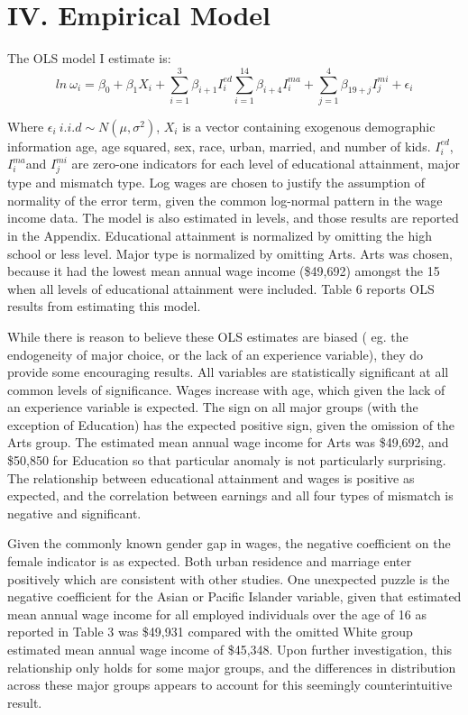 \documentclass[11pt]{article}
\theoremstyle{definition}
\begin{document}
 
\section*{ IV. Empirical Model}
\normalsize
\indent
\par
The OLS model I estimate is:
\begin{equation*}
ln \ \omega_{i}=\beta_{0}+\beta_{1}X_{i}+ \sum_{i=1}^{3} \beta_{i+1}I_{i}^{ed} \sum_{i=1}^{14} \beta_{i+4}I_{i}^{ma} + \sum_{j=1}^{4}\beta_{19+j}I_{j}^{mi}+\epsilon_{i}
\end{equation*}


Where $\epsilon_{i} \ i.i.d \sim N(\mu,\sigma^{2})$, $X_{i}$ is a vector containing exogenous demographic information age, age squared, sex, race, urban, married, and number of kids.  $I_{i}^{ed}$, $I_{i}^{ma}$and $I_{j}^{mi}$ are zero-one indicators for each level of educational attainment, major type and mismatch type.  Log wages are chosen to justify the assumption of normality of the error term, given the common log-normal pattern in the wage income data.  The model is also estimated in levels, and those results are reported in the Appendix.  Educational attainment is normalized by omitting the high school or less level.  Major type is normalized by omitting Arts.  Arts was chosen, because it had the lowest mean annual wage income (\$49,692) amongst the 15 when all levels of educational attainment were included.    Table 6 reports OLS results from estimating this model.

\vspace{2mm}
\normalsize
While there is reason to believe these OLS estimates are biased ( eg. the endogeneity of major choice, or the lack of an experience variable), they do provide some encouraging results.  All variables are statistically significant at all common levels of significance.  Wages increase with age, which given the lack of an experience variable is expected.  The sign on all major groups (with the exception of Education) has the expected positive sign, given the omission of the Arts group.  The estimated mean annual wage income for Arts was \$49,692, and \$50,850 for Education so that particular anomaly is not particularly surprising.  The relationship between educational attainment and wages is positive as expected, and the correlation between earnings and all four types of mismatch is negative and significant.  

Given the commonly known gender gap in wages, the negative coefficient on the female indicator is as expected.  Both urban residence and marriage enter positively which are consistent with other studies.  One unexpected puzzle is the negative coefficient for the Asian or Pacific Islander variable, given that estimated mean annual wage income for all employed individuals over the age of 16 as reported in Table 3 was \$49,931 compared with the omitted White group estimated mean annual wage income of \$45,348.  Upon further investigation, this relationship only holds for some major groups, and the differences in distribution across these major groups appears to account for this seemingly counterintuitive result.
\end{document}
